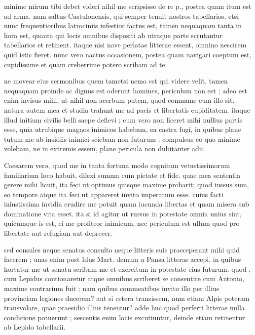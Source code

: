 


 minime mirum tibi debet videri nihil me scripsisse de re p., postea quam itum est ad arma. nam saltus Castulonensis, qui semper tenuit nostros tabellarios, etsi nunc frequentioribus latrociniis infestior factus est, tamen nequaquam tanta in hora est, quanta qui locis omnibus dispositi ab utraque parte scrutantur tabellarios et retinent. itaque nisi nave perlatae litterae essent, omnino nescirem quid istic fieret. nunc vero nactus occasionem, postea quam navigari coeptum est, cupidissime et quam creberrime potero scribam ad te.

 ne movear eius sermonibus quem tametsi nemo est qui videre velit, tamen nequaquam proinde ac dignus est oderunt homines, periculum non est ; adeo est enim invisus mihi, ut nihil non acerbum putem, quod commune cum illo sit. natura autem mea et studia trahunt me ad pacis et libertatis cupiditatem. itaque illud initium civilis belli saepe deflevi ; cum vero non liceret mihi nullius partis esse, quia utrubique magnos inimicos habebam, ea castra fugi, in quibus plane tutum me ab insidiis inimici sciebam non futurum ; compulsus eo quo minime volebam, ne in extremis essem, plane pericula non dubitanter adii.

 Caesarem vero, quod me in tanta fortuna modo cognitum vetustissimorum familiarium loco habuit, dilexi summa cum pietate et fide. quae mea sententia gerere mihi licuit, ita feci ut optimus quisque maxime probarit; quod iussus sum, eo tempore atque ita feci ut appareret invito imperatum esse. cuius facti iniustissima invidia erudire me potuit quam iucunda libertas et quam misera sub dominatione vita esset. ita si id agitur ut rursus in potestate omnia unius sint, quicumque is est, ei me profiteor inimicum, nec periculum est ullum quod pro libertate aut refugiam aut deprecer.

 sed consules neque senatus consulto neque litteris suis praeceperant mihi quid facerem ; unas enim post Idus Mart. demum a Pansa litteras accepi, in quibus hortatur me ut senatu scribam me et exercitum in potestate eius futurum. quod , cum Lepidus contionaretur atque omnibus scriberet se consentire cum Antonio, maxime contrarium fuit ; nam quibus commeatibus invito illo per illius provinciam legiones ducerem? aut si cetera transissem, num etiam Alpis poteram transvolare, quae praesidio illius tenentur? adde huc quod perferri litterae nulla condicione potuerunt ; sescentis enim locis excutiuntur, deinde etiam retinentur ab Lepido tabellarii.

